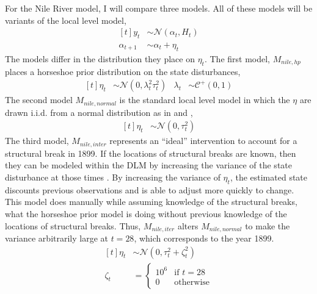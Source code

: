 \documentclass{article}
\newcommand{\dist}[1]{\mathcal{#1}}
\newcommand{\paren}[1]{\ensuremath{\left(#1\right)}}
\newcommand{\dnorm}[1]{\ensuremath{\dist{N}\paren{#1}}}
\newcommand{\dhalfcauchy}[1]{\ensuremath{\dist{C}^{+}\paren{#1}}}
\begin{document}
For the Nile River model, I will compare three models. 
All of these models will be variants of the local level model,
\begin{equation}
  \label{eq:21}
  \begin{aligned}[t]
    y_{t} &\sim \dnorm{\alpha_{t}, H_{t}} \\
    \alpha_{t + 1} &\sim \alpha_{t} + \eta_{t}
  \end{aligned}
\end{equation}
The models differ in the distribution they place on $\eta_{t}$.
The first model, $M_{nile,hp}$ places a horseshoe prior distribution on the state disturbances,
\begin{equation}
  \label{eq:22}
  \begin{aligned}[t]
    \eta_{t} & \sim \dnorm{0, \lambda^{2}_{t} \tau_{t}^{2}} & \lambda_{t} & \sim \dhalfcauchy{0, 1}
  \end{aligned}
\end{equation}
The second model $M_{nile,normal}$ is the standard local level model in which the $\eta$ are drawn i.i.d. from a normal distribution as in \textcite{DurbinKoopman2001} and \textcite{petris2011state},
\begin{equation}
  \label{eq:9}
  \begin{aligned}[t]
    \eta_{t} & \sim \dnorm{0, \tau_{t}^{2}}
  \end{aligned}
\end{equation}
The third model, $M_{nile,inter}$ represents an ``ideal'' intervention to account for a structural break in 1899.
If the locations of structural breaks are known, then they can be modeled within the DLM by increasing the variance of the state disturbance at those times \textcite[Chapter 11][]{WestHarrison1997}.
By increasing the variance of $\eta_{t}$, the estimated state discounts previous observations and is able to adjust more quickly to change.
This model does manually while assuming knowledge of the structural breaks, what the horseshoe prior model is doing without previous knowledge of the locations of structural breaks.
Thus, $M_{nile,iter}$ alters $M_{nile,normal}$ to make the variance arbitrarily large at $t = 28$, which corresponds to the year 1899.
\begin{equation}
  \label{eq:12}
  \begin{aligned}[t]
    \eta_{t} & \sim \dnorm{0, \tau_{t}^{2} + \zeta_{t}^{2}} \\
    \zeta_{t} & = 
    \begin{cases}
      10^{6} & \text{if $t = 28$} \\
      0 & \text{otherwise}
    \end{cases}
  \end{aligned}
\end{equation}
\end{document}
